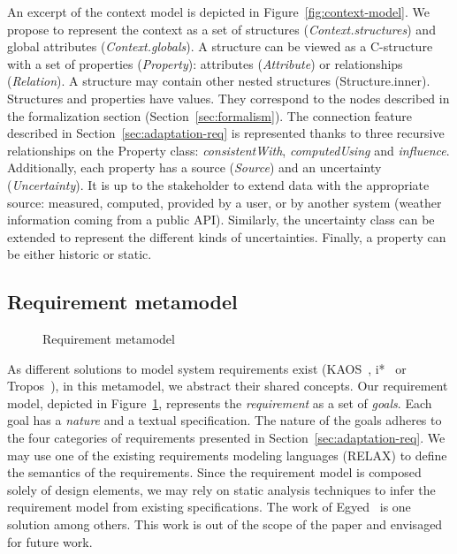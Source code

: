 An excerpt of the context model is depicted in Figure~\ref{fig:context-model}. We propose to represent the context as a set of structures (\textit{Context.structures}) and global attributes (\textit{Context.globals}). A structure can be viewed as a C-structure with a set of properties (\textit{Property}): attributes (\textit{Attribute}) or relationships (\textit{Relation}).  A structure may contain other nested structures (Structure.inner).  
Structures and properties have values. They correspond to the nodes described in the formalization section (\cf Section~\ref{sec:formalism}). The connection feature described in Section~\ref{sec:adaptation-req} is represented thanks to three recursive relationships on the Property class: \textit{consistentWith}, \textit{computedUsing} and \textit{influence}. Additionally, each property has a source (\textit{Source}) and an uncertainty (\textit{Uncertainty}). It is up to the stakeholder to extend data with the appropriate source: measured, computed, provided by a user, or by another system (\eg weather information coming from a public API).
Similarly, the uncertainty class can be extended to represent the different kinds of uncertainties. Finally, a property can be either historic or static.

\subsection{Requirement metamodel}

\begin{figure}
	\centering
	\caption{Requirement metamodel}
	\label{fig:requirement-model}
\end{figure}

As different solutions to model system requirements exist (\eg KAOS~\cite{dardenne1993goal}, i*~\cite{yu2011modelling} or Tropos~\cite{DBLP:journals/aamas/BrescianiPGGM04}), in this metamodel, we abstract their shared concepts.
Our requirement model, depicted in Figure~\ref{fig:requirement-model}, represents the \textit{requirement} as a set of \textit{goals}.
Each goal has a \textit{nature} and a textual specification.
The nature of the goals adheres to the four categories of requirements presented in Section~\ref{sec:adaptation-req}.
We may use one of the existing requirements modeling languages (\eg RELAX) to define the semantics of the requirements. Since the requirement model is composed solely of design elements, we may rely on static analysis techniques to infer the requirement model from existing specifications. The work of Egyed~\cite{egyed01} is one solution among others. This work is out of the scope of the paper and envisaged for future work. 

